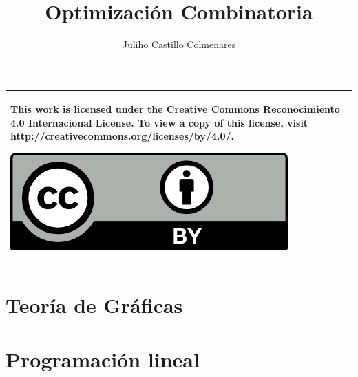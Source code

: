 \documentclass{tufte-book}
\title{Optimización Combinatoria}
\author{Juliho Castillo Colmenares}
\begin{document}
	\maketitle
	\begin{tabular}{|p{}|}
		\hline
		This work is licensed under the Creative Commons Reconocimiento 4.0 Internacional License. To view a copy of this license, visit
		http://creativecommons.org/licenses/by/4.0/.
		\begin{center}
			\includegraphics[scale=1]{./licencia/by.png}
		\end{center}\\
		\hline
	\end{tabular}
	\tableofcontents

\chapter{Teoría de Gráficas}




\chapter{Programación lineal}
	
\end{document}
